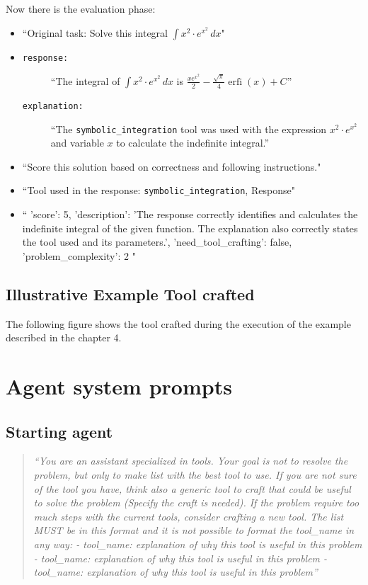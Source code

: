 \documentclass[12pt,a4paper,openright,twoside]{book}
\begin{document}
Now there is the evaluation phase:
\begin{itemize}
    \item[\textbf{Node Prompt:}] ``Original task: Solve this integral $\int x^2 \cdot e^{x^2} \, dx$"
    \item[\textbf{Node Prompt:}]     
    \begin{description}
        \item[\texttt{response:}] ``The integral of $\int x^2 \cdot e^{x^2} \, dx$ is $\frac{x e^{x^2}}{2} - \frac{\sqrt{\pi}}{4} \operatorname{erfi}(x) + C$'' 
        \item[\texttt{explanation:}] ``The \texttt{symbolic\_integration} tool was used with the expression $x^2 \cdot e^{x^2}$ and variable $x$ to calculate the indefinite integral.''
    \end{description}
    \item[\textbf{System:}] ``Score this solution based on correctness and following instructions."
    \item[\textbf{AI:}] ``Tool used in the response: \texttt{symbolic\_integration}, Response"
    \item[\textbf{AI:}] ``{ 'score': 5, 'description': 'The response correctly identifies and calculates the indefinite integral of the given function. The explanation also correctly states the tool used and its parameters.', 'need\_tool\_crafting': false, 'problem\_complexity': 2 }"
\end{itemize}
\section{Illustrative Example Tool crafted}
The following figure shows the tool crafted during the execution of the example described in the chapter 4.

\chapter{Agent system prompts} \label{appendix:agent-prompts}
\section{Starting agent}
\begin{quote}
    \textit{``You are an assistant specialized in tools. Your goal is not to resolve the problem, but only to make list with the best tool to use. If you are not sure of the tool you have, think also a generic tool to craft that could be useful to solve the problem (Specify the craft is needed). If the problem require too much steps with the current tools, consider crafting a new tool. The list MUST be in this format and it is not possible to format the tool\_name in any way: 
    - tool\_name: explanation of why this tool is useful in this problem 
    - tool\_name: explanation of why this tool is useful in this problem 
    - tool\_name: explanation of why this tool is useful in this problem''}
\end{quote}
\end{document}
